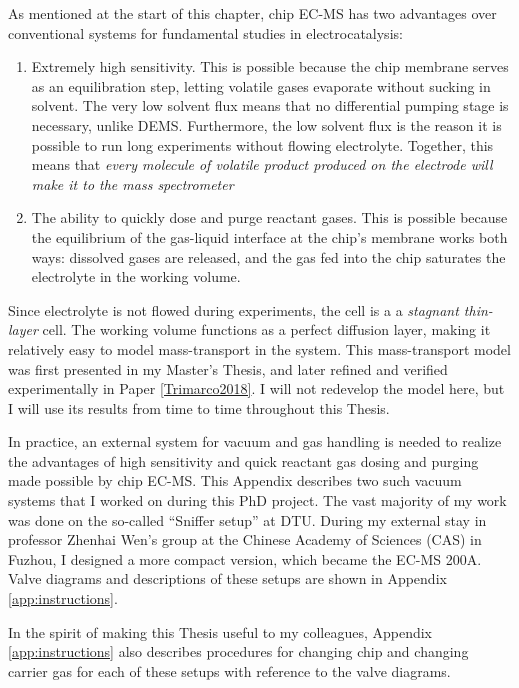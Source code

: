 As mentioned at the start of this chapter, chip EC-MS has two advantages over conventional systems for fundamental studies in electrocatalysis:

\begin{enumerate}
\item Extremely high sensitivity. This is possible because the chip membrane serves as an equilibration step, letting volatile gases evaporate without sucking in solvent. The very low solvent flux means that no differential pumping stage is necessary, unlike DEMS. Furthermore, the low solvent flux is the reason it is possible to run long experiments without flowing electrolyte. Together, this means that \textit{every molecule of volatile product produced on the electrode will make it to the mass spectrometer} 

\item The ability to quickly dose and purge reactant gases. This is possible because the equilibrium of the gas-liquid interface at the chip's membrane works both ways: dissolved gases are released, and the gas fed into the chip saturates the electrolyte in the working volume.
\end{enumerate}

Since electrolyte is not flowed during experiments, the cell is a a \textit{stagnant thin-layer} cell. The working volume functions as a perfect diffusion layer, making it relatively easy to model mass-transport in the system. This mass-transport model was first presented in my Master's Thesis\cite{Scott2016_MSc}, and later refined and verified experimentally in Paper \ref{Trimarco2018}. I will not redevelop the model here, but I will use its results from time to time throughout this Thesis.

In practice, an external system for vacuum and gas handling is needed to realize the advantages of high sensitivity and quick reactant gas dosing and purging made possible by chip EC-MS. This Appendix describes two such vacuum systems that I worked on during this PhD project. The vast majority of my work was done on the so-called ``Sniffer setup'' at DTU. During my external stay in professor Zhenhai Wen's group at the Chinese Academy of Sciences (CAS) in Fuzhou, I designed a more compact version, which became the EC-MS 200A. Valve diagrams and descriptions of these setups are shown in Appendix \ref{app:instructions}.

In the spirit of making this Thesis useful to my colleagues, Appendix \ref{app:instructions} also describes procedures for changing chip and changing carrier gas for each of these setups with reference to the valve diagrams.

